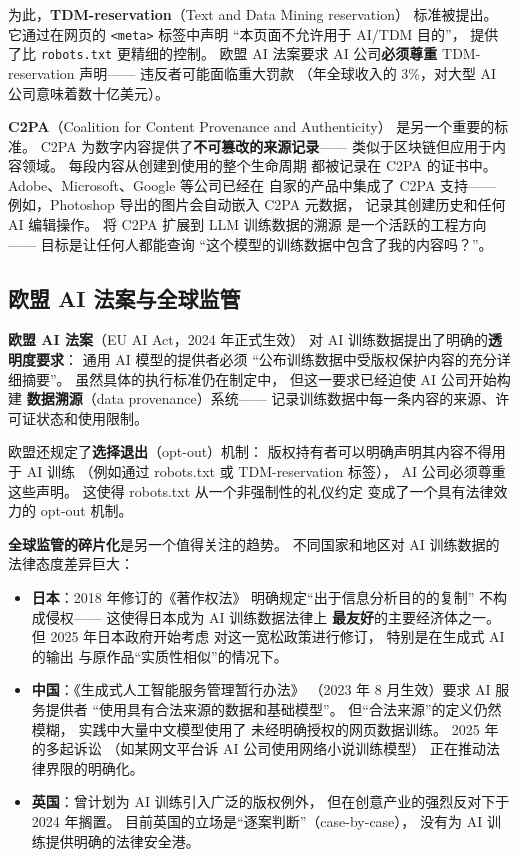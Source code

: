 为此，\textbf{TDM-reservation}（Text and Data Mining reservation）
标准被提出。
它通过在网页的 \texttt{<meta>} 标签中声明
``本页面不允许用于 AI/TDM 目的''，
提供了比 \texttt{robots.txt} 更精细的控制。
欧盟 AI 法案要求 AI 公司\textbf{必须尊重}
TDM-reservation 声明——
违反者可能面临重大罚款
（年全球收入的 3\%，对大型 AI 公司意味着数十亿美元）。

\textbf{C2PA}（Coalition for Content Provenance and Authenticity）
是另一个重要的标准。
C2PA 为数字内容提供了\textbf{不可篡改的来源记录}——
类似于区块链但应用于内容领域。
每段内容从创建到使用的整个生命周期
都被记录在 C2PA 的证书中。
Adobe、Microsoft、Google 等公司已经在
自家的产品中集成了 C2PA 支持——
例如，Photoshop 导出的图片会自动嵌入 C2PA 元数据，
记录其创建历史和任何 AI 编辑操作。
将 C2PA 扩展到 LLM 训练数据的溯源
是一个活跃的工程方向——
目标是让任何人都能查询
``这个模型的训练数据中包含了我的内容吗？''。

\subsection{欧盟 AI 法案与全球监管}

\textbf{欧盟 AI 法案}（EU AI Act，2024 年正式生效）
对 AI 训练数据提出了明确的\textbf{透明度要求}：
通用 AI 模型的提供者必须
``公布训练数据中受版权保护内容的充分详细摘要''。
虽然具体的执行标准仍在制定中，
但这一要求已经迫使 AI 公司开始构建
\textbf{数据溯源}（data provenance）系统——
记录训练数据中每一条内容的来源、许可证状态和使用限制。

欧盟还规定了\textbf{选择退出}（opt-out）机制：
版权持有者可以明确声明其内容不得用于 AI 训练
（例如通过 robots.txt 或 TDM-reservation 标签），
AI 公司必须尊重这些声明。
这使得 robots.txt 从一个非强制性的礼仪约定
变成了一个具有法律效力的 opt-out 机制。

\textbf{全球监管的碎片化}是另一个值得关注的趋势。
不同国家和地区对 AI 训练数据的法律态度差异巨大：

\begin{itemize}[noitemsep]
  \item \textbf{日本}：2018 年修订的《著作权法》
        明确规定``出于信息分析目的的复制''
        不构成侵权——
        这使得日本成为 AI 训练数据法律上
        \textbf{最友好}的主要经济体之一。
        但 2025 年日本政府开始考虑
        对这一宽松政策进行修订，
        特别是在生成式 AI 的输出
        与原作品``实质性相似''的情况下。
  \item \textbf{中国}：《生成式人工智能服务管理暂行办法》
        （2023 年 8 月生效）要求 AI 服务提供者
        ``使用具有合法来源的数据和基础模型''。
        但``合法来源''的定义仍然模糊，
        实践中大量中文模型使用了
        未经明确授权的网页数据训练。
        2025 年的多起诉讼
        （如某网文平台诉 AI 公司使用网络小说训练模型）
        正在推动法律界限的明确化。
  \item \textbf{英国}：曾计划为 AI 训练引入广泛的版权例外，
        但在创意产业的强烈反对下于 2024 年搁置。
        目前英国的立场是``逐案判断''（case-by-case），
        没有为 AI 训练提供明确的法律安全港。
\end{itemize}

